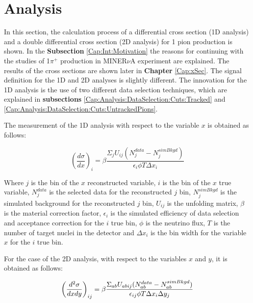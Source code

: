 \chapter{Analysis}
\minitoc
\label{Cap:Analysis}


\label{Cap:Analysis:Introduction}
 In this section, the calculation process of a differential cross section (1D analysis) and a double differential cross section (2D analysis) for 1 pion production is shown. In the \textbf{Subsection} \ref{Cap:Int:Motivation} the reasons for continuing with the studies of 1$\pi^+$ production in MINER$\nu$A experiment are explained. The results of the cross sections are shown later in \textbf{Chapter} \ref{Cap:xSec}. The signal definition for the 1D and 2D analyses is slightly different. The innovation for the 1D analysis is the use of two different data selection techniques, which are explained in \textbf{subsections} \ref{Cap:Analysis:DataSelection:Cuts:Tracked} and \ref{Cap:Analysis:DataSelection:Cuts:UntrackedPions}. 

The measurement of the 1D analysis with respect to the variable $x$ is obtained as follows:

\begin{equation}
    \left(\frac{d\sigma}{dx}\right)_i= \beta \frac{\Sigma_{j}U_{ij}(N^{data}_j - N^{simBkgd}_j)}{\epsilon_{i}\phi T\Delta x_i}
    \label{eq:difXSec}
\end{equation}

Where $j$ is the bin of the $x$ reconstructed variable, $i$ is the bin of the $x$ true variable, $N_j^{data}$ is the selected data for the reconstructed $j$ bin, $N_j^{sim Bkgd}$ is the simulated background for the reconstructed $j$ bin, $U_{ij}$ is the unfolding matrix, $\beta$ is the material correction factor, $\epsilon_i$ is the simulated efficiency of data selection and acceptance correction for the $i$ true bin, $\phi$ is the neutrino flux, $T$ is the number of target nuclei in the detector and $\Delta x_i$ is the bin width for the variable $x$ for the $i$ true bin.

For the case of the 2D analysis, with respect to the variables $x$ and $y$, it is obtained as follows:

\begin{equation}
    \centering
    \left(\frac{d^2\sigma}{dxdy}\right)_{ij}= \beta \frac{\Sigma_{ab}U_{abij}(N^{data}_{ab} - N^{simBkgd}_{ab})}{\epsilon_{ij}\phi T\Delta x_{i} \Delta y_j}
\end{equation}

